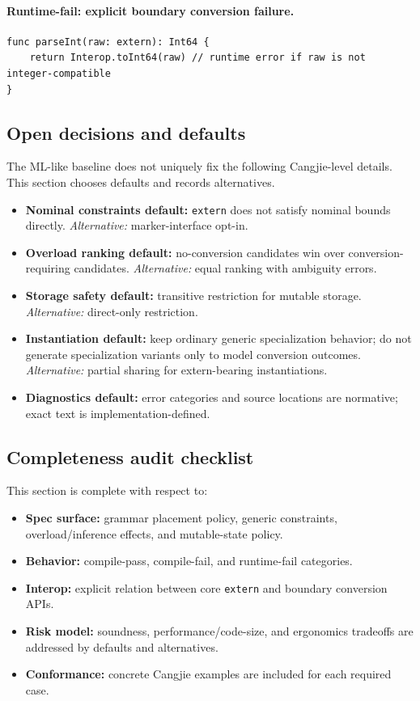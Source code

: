 \documentclass[11pt,a4paper]{article}
\begin{document}
\paragraph{Runtime-fail: explicit boundary conversion failure.}
\begin{verbatim}
func parseInt(raw: extern): Int64 {
    return Interop.toInt64(raw) // runtime error if raw is not integer-compatible
}
\end{verbatim}

\subsection{Open decisions and defaults}

The ML-like baseline does not uniquely fix the following Cangjie-level details.
This section chooses defaults and records alternatives.

\begin{itemize}
  \item \textbf{Nominal constraints default:} \texttt{extern} does not satisfy nominal bounds directly. \emph{Alternative:} marker-interface opt-in.
  \item \textbf{Overload ranking default:} no-conversion candidates win over conversion-requiring candidates. \emph{Alternative:} equal ranking with ambiguity errors.
  \item \textbf{Storage safety default:} transitive restriction for mutable storage. \emph{Alternative:} direct-only restriction.
  \item \textbf{Instantiation default:} keep ordinary generic specialization behavior; do not generate specialization variants only to model conversion outcomes. \emph{Alternative:} partial sharing for extern-bearing instantiations.
  \item \textbf{Diagnostics default:} error categories and source locations are normative; exact text is implementation-defined.
\end{itemize}

\subsection{Completeness audit checklist}

This section is complete with respect to:
\begin{itemize}
  \item \textbf{Spec surface:} grammar placement policy, generic constraints, overload/inference effects, and mutable-state policy.
  \item \textbf{Behavior:} compile-pass, compile-fail, and runtime-fail categories.
  \item \textbf{Interop:} explicit relation between core \texttt{extern} and boundary conversion APIs.
  \item \textbf{Risk model:} soundness, performance/code-size, and ergonomics tradeoffs are addressed by defaults and alternatives.
  \item \textbf{Conformance:} concrete Cangjie examples are included for each required case.
\end{itemize}
\end{document}
